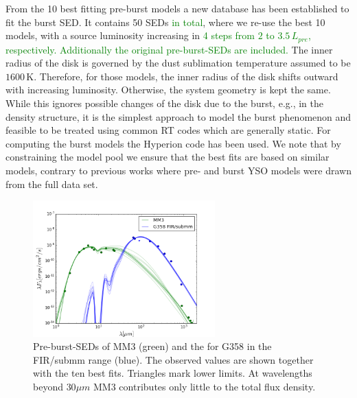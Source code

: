 \documentclass[longauth,usenatbib]{aa}
\begin{document}
From the 10 best fitting pre-burst models a new database has been established to fit the burst SED. It contains 50 SEDs \textcolor{green}{in total}, where we re-use the best 10 models, with a source %
luminosity increasing in \textcolor{green}{4 steps from $2$ to $3.5\,L_{pre}$, respectively. Additionally the original pre-burst-SEDs are included.}
The inner radius of the disk is governed by the dust sublimation temperature assumed to be $1600\,$K. Therefore, for those models, the inner radius of the disk shifts outward with increasing luminosity. Otherwise, the system geometry is kept the same.
While this ignores possible changes of the disk due to the burst, e.g., in the density structure, it is the simplest approach to model the burst phenomenon and feasible to be treated using common RT codes which are generally static. For computing the burst models the Hyperion code 
 has been used. 
 We note that by constraining the model pool we ensure that the best fits are based on similar models, contrary to previous works where pre- and burst YSO models were drawn from the full data set. 
 
\begin{figure}
\centering
	\includegraphics[width=7cm]{G358_Pre_ap5.png}
	\caption{Pre-burst-SEDs of MM3 (green) and the for G358 in the FIR/submm range (blue). The observed values are shown together with the ten best fits. Triangles mark lower limits. At wavelengths beyond $30 \mu m$ MM3 contributes only little to the total flux density.
	}
 \label{fig:sed g358 pre}
\end{figure}
\end{document}
